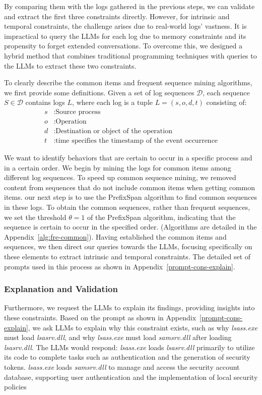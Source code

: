 By comparing them with the logs gathered in the previous steps, we can validate and extract the first three constraints directly.
However, for intrinsic and temporal constraints, the challenge arises due to real-world logs' vastness. It is impractical to query the LLMs for each log due to memory constraints and its propensity to forget extended conversations. To overcome this, we designed a hybrid method that combines traditional programming techniques with queries to the LLMs to extract these two constraints.

To clearly describe the common items and frequent sequence mining algorithms, we first provide some definitions.
Given a set of log sequences \( \mathcal{D} \), each sequence \( S \in \mathcal{D} \) contains logs \( L \), where each log is a tuple \( L = (s, o, d,t) \) consisting of:
\begin{align*}
    s & : \text{Source process} \\
    o & : \text{Operation} \\
    d & : \text{Destination or object of the operation}\\
    t & : \text{time specifies the timestamp of the event occurrence}
\end{align*}

We want to identify behaviors that are certain to occur in a specific process and in a certain order. 
We begin by mining the logs for common items among different log sequences.   
To speed up common sequence mining, we removed content from sequences that do not include common items when getting common items.
our next step is to use the PrefixSpan algorithm to find common sequences in these logs. 
To obtain the common sequences, rather than frequent sequences, we set the threshold \( \theta =1\) of the PrefixSpan algorithm, indicating that the sequence is certain to occur in the specified order.
(Algorithms are detailed in the Appendix~\ref{alg:fre-common}).
Having established the common items and sequences, we then direct our queries towards the LLMs, focusing specifically on these elements to extract intrinsic and temporal constraints. 
The detailed set of prompts used in this process as shown in Appendix~\ref{prompt-cons-explain}.


\subsubsection{Explanation and Validation}

Furthermore, we request the LLMs to explain its findings, providing insights into these constraints.
Based on the prompt as shown in Appendix~\ref{prompt-cons-explain}, we ask LLMs to explain why this constraint exists, such as why \textit{lsass.exe} must load \textit{lsasrv.dll}, and why \textit{lsass.exe} must load \textit{samsrv.dll} after loading \textit{lsasrv.dll}. 
The LLMs would respond: \textit{lsass.exe} loads \textit{lsasrv.dll} primarily to utilize its code to complete tasks such as authentication and the generation of security tokens. 
\textit{lsass.exe} loads \textit{samsrv.dll} to manage and access the security account database, supporting user authentication and the implementation of local security policies

